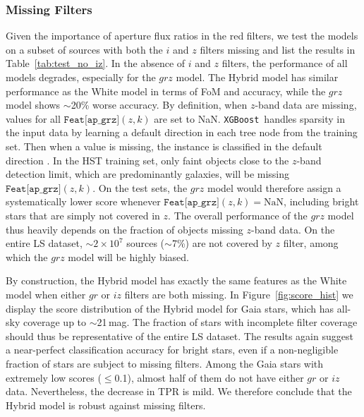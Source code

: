 \documentclass[twocolumn]{aastex631}
\newcommand{\xgboost}{\texttt{XGBoost}}
\begin{document}
\begin{CJK*}{UTF8}{gbsn}
\subsubsection{Missing Filters}
Given the importance of aperture flux ratios in the red filters, we test the models on a subset of sources with both the $i$ and $z$ filters missing and list the results in Table~\ref{tab:test_no_iz}. In the absence of $i$ and $z$ filters, the performance of all models degrades, especially for the $grz$ model. The Hybrid model has similar performance as the White model in terms of FoM and accuracy, while the $grz$ model shows $\sim$20\% worse accuracy. By definition, when $z$-band data are missing, values for all $\texttt{Feat[ap\_grz]}(z, k)$ are set to NaN. \xgboost\ handles sparsity in the input data by learning a default direction in each tree node from the training set. Then when a value is missing, the instance is classified in the default direction \citep{XGBoost_2016}. In the HST training set, only faint objects close to the $z$-band detection limit, which are predominantly galaxies, will be missing $\texttt{Feat[ap\_grz]}(z, k)$. On the test sets, the $grz$ model would therefore assign a systematically lower score whenever $\texttt{Feat[ap\_grz]}(z, k)=\mathrm{NaN}$, including bright stars that are simply not covered in $z$. The overall performance of the $grz$ model thus heavily depends on the fraction of objects missing $z$-band data. On the entire LS dataset, $\sim$$2\times10^7$ sources ($\sim$7\%) are not covered by $z$ filter, among which the $grz$ model will be highly biased. %

By construction, the Hybrid model has exactly the same features as the White model when either $gr$ or $iz$ filters are both missing. In Figure~\ref{fig:score_hist} we display the score distribution of the Hybrid model for Gaia stars, which has all-sky coverage up to $\sim$21\,mag. The fraction of stars with incomplete filter coverage should thus be representative of the entire LS dataset. The results again suggest a near-perfect classification accuracy for bright stars, even if a non-negligible fraction of stars are subject to missing filters. Among the Gaia stars with extremely low scores ($\le$0.1), almost half of them do not have either $gr$ or $iz$ data. Nevertheless, the decrease in TPR is mild. We therefore conclude that the Hybrid model is robust against missing filters.


\end{CJK*}
\end{document}

